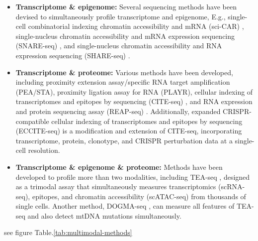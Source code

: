 \begin{itemize}
	\item \textbf{Transcriptome \& epigenome:}
	Several sequencing methods have been devised to simultaneously profile transcriptome and epigenome, E.g., single-cell combinatorial indexing chromatin accessibility and mRNA (sci-CAR) \citep{cao2018scicar}, single-nucleus chromatin accessibility and mRNA expression sequencing (SNARE-seq) \citep{chen2019SNARE}, and single-nucleus chromatin accessibility and RNA expression sequencing (SHARE-seq) \citep{ma2020shareseq}.
	

	\item \textbf{Transcriptome \& proteome:}
	Various methods have been developed, including proximity extension assay/specific RNA target amplification (PEA/STA), proximity ligation assay for RNA (PLAYR), cellular indexing of transcriptomes and epitopes by sequencing (CITE-seq) \citep{stoeckius2017citeseq}, and RNA expression and protein sequencing assay (REAP-seq) \citep{peterson2017reapseq}. Additionally, expanded CRISPR-compatible cellular indexing of transcriptomes and epitopes by sequencing (ECCITE-seq) \citep{mimitou2019ECCITE} is a modification and extension of CITE-seq, incorporating transcriptome, protein, clonotype, and CRISPR perturbation data at a single-cell resolution.


	\item \textbf{Transcriptome \& epigenome \& proteome:}
	Methods have been developed to profile more than two modalities, including TEA-seq \citep{swanson2021simultaneous}, designed as a trimodal assay that simultaneously measures transcriptomics (scRNA-seq), epitopes, and chromatin accessibility (scATAC-seq) from thousands of single cells. Another method, DOGMA-seq \citep{mimitou2021scalable}, can measure all features of TEA-seq and also detect mtDNA mutations simultaneously.

\end{itemize}

see figure Table.\ref{tab:multimodal-methods}

